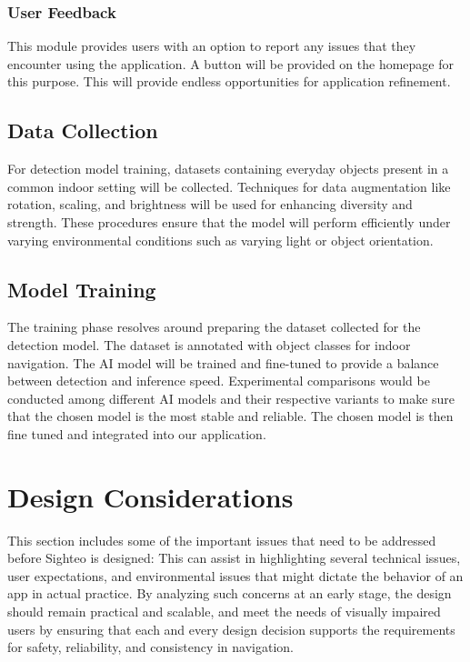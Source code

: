 \documentclass{FastFyp}
\begin{document}
\subsubsection{User Feedback}
This module provides users with an option to report any issues that they encounter using the application. A button will be provided on the homepage for this purpose. This will provide endless opportunities for application refinement.

\subsection{Data Collection}
For detection model training, datasets containing everyday objects present in a common indoor setting will be collected. Techniques for data augmentation like rotation, scaling, and brightness will be used for enhancing diversity and strength. These procedures ensure that the model will perform efficiently under varying environmental conditions such as varying light or object orientation.

\subsection{Model Training}
The training phase resolves around preparing the dataset collected for the detection model. The dataset is annotated with object classes for indoor navigation. The AI model will be trained and fine-tuned to provide a balance between detection and inference speed. Experimental comparisons would be conducted among different AI models and their respective variants to make sure that the chosen model is the most stable and reliable. The chosen model is then fine tuned and integrated into our application.

\section{Design Considerations}
This section includes some of the important issues that need to be addressed before Sighteo is designed: This can assist in highlighting several technical issues, user expectations, and environmental issues that might dictate the behavior of an app in actual practice. By analyzing such concerns at an early stage, the design should remain practical and scalable, and meet the needs of visually impaired users by ensuring that each and every design decision supports the requirements for safety, reliability, and consistency in navigation.
\end{document}
